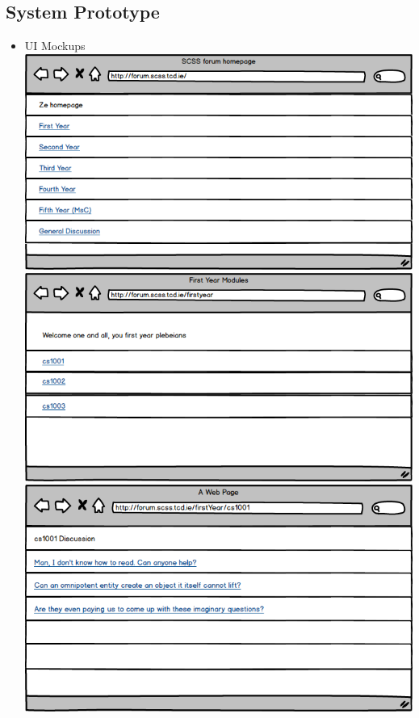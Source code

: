 \documentclass[a4paper, 12pt]{article}
\begin{document}
		\subsection{System Prototype}
			\begin{itemize}
				\item UI Mockups \\
				\vspace{10 mm}
				\includegraphics[width=\textwidth]{homepage}
				\vspace{10 mm}
				\includegraphics[width=\textwidth]{yearPage}
				\vspace{10 mm}
				\includegraphics[width=\textwidth]{coursePage}

\end{itemize}
\end{document}

